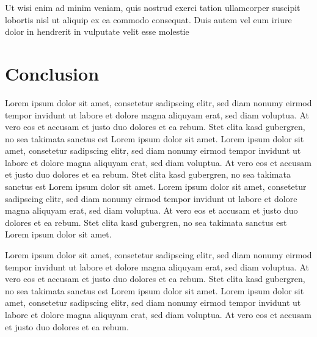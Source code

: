 \documentclass[journal]{vgtc}
\begin{document}
Ut wisi enim ad minim veniam, quis nostrud exerci tation ullamcorper
suscipit lobortis nisl ut aliquip ex ea commodo consequat. Duis autem
vel eum iriure dolor in hendrerit in vulputate velit esse molestie

\section{Conclusion}

Lorem ipsum dolor sit amet, consetetur sadipscing elitr, sed diam
nonumy eirmod tempor invidunt ut labore et dolore magna aliquyam erat,
sed diam voluptua. At vero eos et accusam et justo duo dolores et ea
rebum. Stet clita kasd gubergren, no sea takimata sanctus est Lorem
ipsum dolor sit amet. Lorem ipsum dolor sit amet, consetetur
sadipscing elitr, sed diam nonumy eirmod tempor invidunt ut labore et
dolore magna aliquyam erat, sed diam voluptua. At vero eos et accusam
et justo duo dolores et ea rebum. Stet clita kasd gubergren, no sea
takimata sanctus est Lorem ipsum dolor sit amet. Lorem ipsum dolor sit
amet, consetetur sadipscing elitr, sed diam nonumy eirmod tempor
invidunt ut labore et dolore magna aliquyam erat, sed diam
voluptua. At vero eos et accusam et justo duo dolores et ea
rebum. Stet clita kasd gubergren, no sea takimata sanctus est Lorem
ipsum dolor sit amet.

Lorem ipsum dolor sit amet, consetetur sadipscing elitr, sed diam
nonumy eirmod tempor invidunt ut labore et dolore magna aliquyam erat,
sed diam voluptua. At vero eos et accusam et justo duo dolores et ea
rebum. Stet clita kasd gubergren, no sea takimata sanctus est Lorem
ipsum dolor sit amet. Lorem ipsum dolor sit amet, consetetur
sadipscing elitr, sed diam nonumy eirmod tempor invidunt ut labore et
dolore magna aliquyam erat, sed diam voluptua. At vero eos et accusam
et justo duo dolores et ea rebum.




\end{document}
